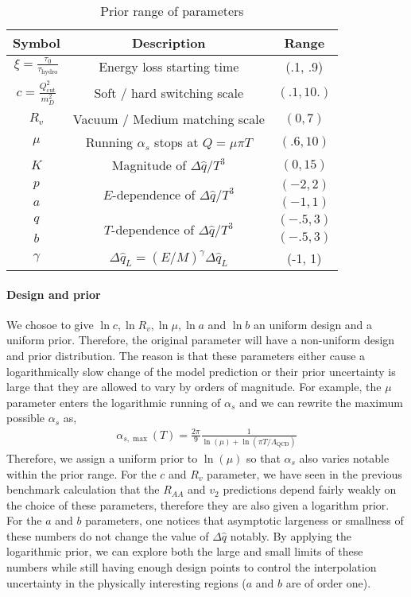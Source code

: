 \begin{table}
\centering
\caption{Prior range of parameters}\label{table:new:prior}
\begin{tabular}{ccc}
\hline
Symbol & Description & Range \\
\hline
$\xi = \frac{\tau_0}{\tau_{\textrm{hydro}}}$ & Energy loss starting time & (.1, .9) \\
$c = \frac{Q_{\textrm{cut}}^2}{m_D^2}$ & Soft / hard switching scale & $(.1, 10.)$ \\
$R_v$ & Vacuum / Medium matching scale & $(0,7)$\\
$\mu$ & Running $\alpha_s$ stops at $Q = \mu\pi T$ & $(.6, 10)$ \\
$K$ & Magnitude of $\Delta \hat{q}/T^3$ & $(0, 15)$\\ 
$p$ & \multirow{2}{*}{$E$-dependence of $\Delta \hat{q}/T^3$} & $(-2, 2)$\\ 
$a$ &  & $(-1, 1)$\\ 
$q$ & \multirow{2}{*}{$T$-dependence of $\Delta \hat{q}/T^3$}  & $(-.5, 3)$\\ 
$b$ &   & $(-.5, 3)$\\ 
$\gamma$ & $\Delta \hat{q}_L = (E/M)^\gamma\Delta \hat{q}_L$  & (-1, 1)\\ 
\hline
\end{tabular}
\end{table}

\paragraph{Design and prior} 
We chosoe to give $\ln c, \ln R_v, \ln \mu, \ln a$ and $\ln b$ an uniform design and a uniform prior.
Therefore, the original parameter will have a non-uniform design and prior distribution.
The reason is that these parameters either cause a logarithmically slow change of the model prediction or their prior uncertainty is large that they are allowed to vary by orders of magnitude.
For example, the $\mu$ parameter enters the logarithmic running of $\alpha_s$ and we can rewrite the maximum possible $\alpha_s$ as,
\begin{eqnarray}
\alpha_{s,\max}(T) = \frac{2\pi}{9}\frac{1}{\ln(\mu) + \ln(\pi T/\Lambda_{\textrm{QCD}})}
\end{eqnarray}
Therefore, we assign a uniform prior to $\ln(\mu)$ so that $\alpha_s$ also varies notable within the prior range.
For the $c$ and $R_v$ parameter, we have seen in the previous benchmark calculation that the $R_{AA}$ and $v_2$ predictions depend fairly weakly on the choice of these parameters, therefore they are also given a logarithm prior.
For the $a$ and $b$ parameters, one notices that asymptotic largeness or smallness of these numbers do not change the value of $\Delta \hat{q}$ notably.
By applying the logarithmic prior, we can explore both the large and small limits of these numbers while still having enough design points to control the interpolation uncertainty in the physically interesting regions ($a$ and $b$ are of order one). 


